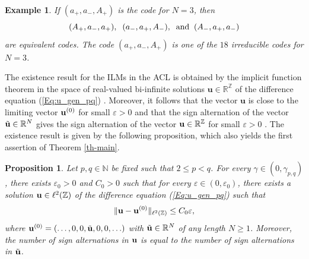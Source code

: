 \documentclass[12pt,reqno]{amsart}
\newtheorem{example}{Example}
\newtheorem{prop}{Proposition}
\begin{document}
\begin{example}
	\label{ex-1}
	If $(a_+,a_-,A_+)$ is the code for $N = 3$, then 
	$$
(A_+,a_-,a_+), \;\; (a_-,a_+,A_-), \;\; \mbox{\rm and} \;\; 
(A_-,a_+,a_-)
$$ 
are equivalent codes. The code $(a_+,a_-,A_+)$ is one of the $18$ irreducible codes for $N = 3$. 
\end{example}


The existence result for the ILMs in the ACL is obtained by the implicit function theorem in the space of real-valued bi-infinite solutions $\mathbf{u} \in \mathbb{R}^{\mathbb{Z}}$ of the difference equation (\ref{Eq:u_gen_pq}) \cite{MA1994,A1997}. Moreover, it follows that the vector $\mathbf{u}$ is close to the limiting vector ${\bf u}^{(0)}$ for small $\varepsilon > 0$ and that the sign alternation of the vector $\tilde{\bf u} \in \mathbb{R}^N$ gives the sign alternation of the vector ${\bf u} \in \mathbb{R}^{\mathbb{Z}}$ for small $\varepsilon > 0$ \cite{ABK04,PKF05}. The existence result is given by the following proposition, which also yields the first assertion of Theorem \ref{th-main}.

\begin{prop}
	\label{prop-existence}
	Let $p,q \in \mathbb{N}$ be fixed such that $2 \leq p < q$. 
	For every $\gamma \in (0,\gamma_{{p,q}})$, there exists $\varepsilon_0 > 0$ and $C_0 > 0$ such that for every $\varepsilon \in (0,\varepsilon_0)$, there exists 
	a solution ${\bf u} \in \ell^2(\mathbb{Z})$ of the difference 
	equation (\ref{Eq:u_gen_pq}) such that 
\begin{equation}
\label{bound-u}
	\| {\bf u} - {\bf u}^{(0)} \|_{\ell^2(\mathbb{Z})} \leq C_0 \varepsilon,
\end{equation}
	where ${\bf u}^{(0)} = (\ldots,0,0,\tilde{\bf u},0,0,\ldots)$ with  $\tilde{\bf u} \in \mathbb{R}^N$ of any length $N \geq 1$. Moreover, 
	the number of sign alternations in ${\bf u}$ is equal to the number of sign alternations in $\tilde{\bf u}$.
\end{prop}
\end{document}
